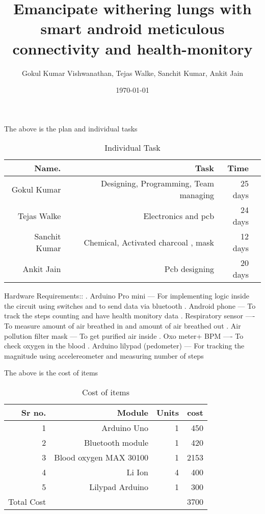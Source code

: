 \documentclass[12pt]{article}
\title{Emancipate withering lungs with smart android meticulous connectivity and health-monitory}
\author{Gokul Kumar Vishwanathan, Tejas Walke, Sanchit Kumar, Ankit Jain }
\date{\today}
\begin{document}
\maketitle
\newpage
The above is the plan and individual tasks
\vspace{1ex}

\begin{table}
\centering
\caption{Individual Task}
\begin{tabular}{||r|r|r|r|}\hline
Name. & Task & Time\\ \hline
Gokul Kumar & Designing, Programming, Team managing & 25 days\\ \hline
Tejas Walke &Electronics and pcb & 24 days\\ \hline
Sanchit Kumar & Chemical, Activated charcoal , mask & 12 days\\ \hline
Ankit Jain & Pcb designing & 20 days\\  \hline
\end{tabular}

\end{table}


Hardware Requirements::
.	Arduino Pro mini --- For implementing logic inside the circuit using switches and to send data via bluetooth
.	Android phone --- To track the steps counting and have health monitory data
.	Respiratory sensor  ---- To measure amount of air breathed in and amount of air breathed out 
.	Air pollution filter mask --- To get purified air inside
.	Oxo meter+ BPM ---- To check oxygen in the blood 
.	Arduino lilypad (pedometer) --- For tracking the magnitude using accelereometer and measuring number of steps
\newline






\newpage
The above is the cost of items
\vspace{1ex}
\begin{table}
\centering
\caption{Cost of items}
\begin{tabular}{||r|r|r|r|}\hline
Sr no. & Module & Units & cost\\ \hline
1 & Arduino Uno & 1 & 450\\ \hline
2 & Bluetooth module & 1 & 420\\ \hline
3 & Blood oxygen MAX 30100 & 1 & 2153\\ \hline
4 & Li Ion & 4 & 400\\  \hline
5 & Lilypad Arduino & 1 & 300\\ \hline
Total Cost & &  &3700\\ \hline

\end{tabular}

\end{table}
\newline
\end{document}
